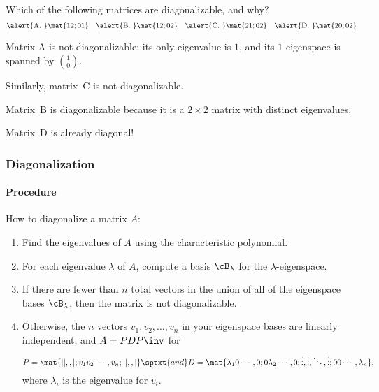 \begin{pollframe}

\begin{bluebox}[Poll]{.8\linewidth}
  Which of the following matrices are diagonalizable, and why?
  \[
  \alert{\text{A. }} \mat{1 2; 0 1} \quad
  \alert{\text{B. }} \mat{1 2; 0 2} \quad
  \alert{\text{C. }} \mat{2 1; 0 2} \quad
  \alert{\text{D. }} \mat{2 0; 0 2}
  \]
\end{bluebox}

\pause\bigskip
Matrix \alert{A} is not diagonalizable: its only eigenvalue is $1$, and its
$1$-eigenspace is spanned by ${1\choose 0}$.

\pause\bigskip
Similarly, matrix~\alert{C} is not diagonalizable.

\pause\bigskip
Matrix~\alert{B} is diagonalizable because it is a $2\times 2$ matrix with
distinct eigenvalues.

\pause\bigskip
Matrix~\alert{D} is already diagonal!

\end{pollframe}



\begin{frame}
\frametitle{Diagonalization}
\framesubtitle{Procedure}

\alert{\large How to diagonalize a matrix $A$:}
\begin{enumerate}
  \pause
\item Find the eigenvalues of $A$ using the characteristic polynomial. 
  \pause
\item For each eigenvalue $\lambda$ of $A$, compute a basis $\cB_\lambda$ for the
  $\lambda$-eigenspace.
  \pause
\item If there are fewer than $n$ total vectors in the union of all of the
  eigenspace bases $\cB_\lambda$, then the matrix is not diagonalizable.
  \pause
\item Otherwise, the $n$ vectors $v_1,v_2,\ldots,v_n$ in your eigenspace bases are
  linearly independent, and $A = PDP\inv$ for
  \[ P = \mat{| |,, |; v_1 v_2 \cdots, v_n; | | ,, |} \sptxt{and}
  D = \mat{\lambda_1 0 \cdots, 0;
    0 \lambda_2 \cdots, 0;
    \vdots, \vdots, \ddots, \vdots;
    0 0 \cdots, \lambda_n}, \]
  where $\lambda_i$ is the eigenvalue for $v_i$.

\end{enumerate}

\end{frame}


